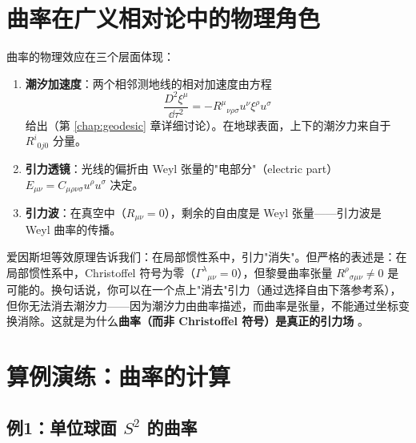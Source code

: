 \section{曲率在广义相对论中的物理角色}

曲率的物理效应在三个层面体现：

\begin{enumerate}
    \item \textbf{潮汐加速度}：两个相邻测地线的相对加速度由方程
    \begin{equation}
        \frac{D^2 \xi^\mu}{\dd\tau^2} = -R^\mu{}_{\nu\rho\sigma} u^\nu \xi^\rho u^\sigma
    \end{equation}
    给出（第 \ref{chap:geodesic} 章详细讨论）。在地球表面，上下的潮汐力来自于 $R^i{}_{0j0}$ 分量。

    \item \textbf{引力透镜}：光线的偏折由 Weyl 张量的"电部分"（electric part）$E_{\mu\nu} = C_{\mu\rho\nu\sigma} u^\rho u^\sigma$ 决定。

    \item \textbf{引力波}：在真空中（$R_{\mu\nu} = 0$），剩余的自由度是 Weyl 张量——引力波是 Weyl 曲率的传播。
\end{enumerate}

\begin{remark}[曲率与等效原理的统一]
爱因斯坦等效原理告诉我们：在局部惯性系中，引力"消失"。但严格的表述是：在局部惯性系中，Christoffel 符号为零（$\Gamma^\lambda{}_{\mu\nu} = 0$），但黎曼曲率张量 $R^\rho{}_{\sigma\mu\nu} \neq 0$ 是可能的。换句话说，你可以在一个点上"消去"引力（通过选择自由下落参考系），但你无法消去潮汐力——因为潮汐力由曲率描述，而曲率是张量，不能通过坐标变换消除。这就是为什么\textbf{曲率（而非 Christoffel 符号）是真正的引力场} \cite{Wald1984,Morita2022}。
\end{remark}

\section{算例演练：曲率的计算}

\subsection{例1：单位球面 $S^2$ 的曲率}

